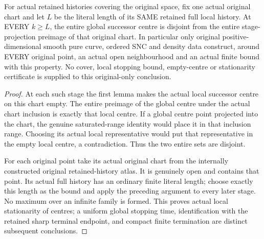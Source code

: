 \begin{theorem}
\label{hir:sharp-actual-curve-global-centres-locally-stationary}
\leanok
For actual retained histories covering the original space, fix one actual
original chart and let $L$ be the literal length of its SAME retained full
local history. At EVERY $k\ge L$, the entire global successor centre is
disjoint from the entire stage-projection preimage of that original
chart. In particular only original positive-dimensional smooth pure
curve, ordered SNC and density data construct, around EVERY original
point, an actual open neighbourhood and an actual finite bound with this
property. No cover, local stopping bound, empty-centre or stationarity
certificate is supplied to this original-only conclusion.
\end{theorem}
\begin{proof}
At each such stage the first lemma makes the actual local successor
centre on this chart empty. The entire preimage of the global centre
under the actual chart inclusion is exactly that local centre. If a
global centre point projected into the chart, the genuine saturated-range
identity would place it in that inclusion range. Choosing its actual
local representative would put that representative in the empty local
centre, a contradiction. Thus the two entire sets are disjoint.

For each original point take its actual original chart from the internally
constructed original retained-history atlas. It is genuinely open and
contains that point. Its actual full history has an ordinary finite
literal length; choose exactly this length as the bound and apply the
preceding argument to every later stage. No maximum over an infinite
family is formed. This proves actual local stationarity of centres;
a uniform global stopping time, identification with the retained sharp
terminal endpoint, and compact finite termination are distinct subsequent
conclusions.
\end{proof}

